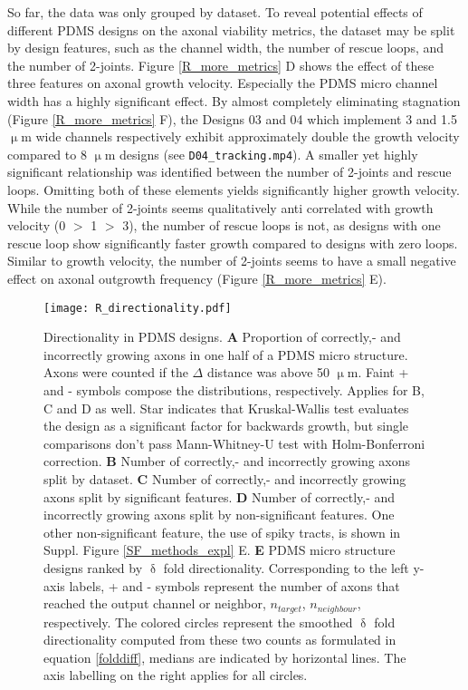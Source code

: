So far, the data was only grouped by dataset. To reveal potential effects of
different PDMS designs on the axonal viability metrics, the dataset may be split
by design features, such as the channel width, the number of rescue loops, and
the number of 2-joints. Figure \ref{R_more_metrics} D shows the effect of these
three features on axonal growth velocity. Especially the PDMS micro channel
width has a highly significant effect. By almost completely eliminating
stagnation (Figure \ref{R_more_metrics} F),  the Designs 03 and 04 which
implement 3 and 1.5 $\upmu$m wide channels respectively exhibit approximately
double the growth velocity compared to 8 $\upmu$m designs (see
\verb|D04_tracking.mp4|). A smaller yet highly significant relationship was
identified between the number of 2-joints and rescue loops. Omitting both of
these elements yields significantly higher growth velocity. While the number of
2-joints seems qualitatively anti correlated with growth velocity (0 $>$ 1 $>$
3), the number of rescue loops is not, as designs with one rescue loop show
significantly faster growth compared to designs with zero loops. Similar to
growth velocity, the number of 2-joints seems to have a small negative effect on
axonal outgrowth frequency (Figure \ref{R_more_metrics} E).

\begin{figure}[h!]
    \texttt{[image: R\_directionality.pdf]}
    \caption[Directionality in PDMS designs]
        {Directionality in PDMS designs. \textbf{A} Proportion of correctly,-
        and incorrectly growing axons in one half of a PDMS micro structure.
        Axons were counted if the $\Delta$ distance was above 50 $\upmu$m. Faint
        + and - symbols compose the distributions, respectively. Applies for B,
        C and D as well. Star indicates that Kruskal-Wallis test evaluates the
        design as a significant factor for backwards growth, but single
        comparisons don't pass Mann-Whitney-U test with Holm-Bonferroni
        correction. \textbf{B} Number of correctly,- and incorrectly growing
        axons split by dataset. \textbf{C} Number of correctly,- and incorrectly
        growing axons split by significant features. \textbf{D} Number of
        correctly,- and incorrectly growing axons split by non-significant
        features. One other non-significant feature, the use of spiky tracts, is
        shown in Suppl. Figure \ref{SF_methods_expl} E. \textbf{E} PDMS micro
        structure designs ranked by $\updelta$ fold directionality.
        Corresponding to the left y-axis labels, + and - symbols represent the
        number of axons that reached the output channel or neighbor,
        $n_{target}$, $n_{neighbour}$, respectively. The colored circles
        represent the smoothed $\updelta$ fold directionality computed from
        these two counts as formulated in equation \ref{folddiff}, medians are
        indicated by horizontal lines. The axis labelling on the right applies
        for all circles. } 
    \label{R_directionality}
\end{figure}

